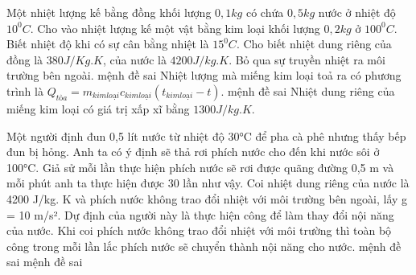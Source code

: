 \begin{ex}
Một nhiệt lượng kế bằng đồng khối lượng $0,1 kg$ có chứa $0,5 kg$ nước ở nhiệt độ $10^0C$. Cho vào nhiệt lượng kế một vật bằng kim loại khối lượng $0,2 kg$ ở $100^0C$. Biết nhiệt độ khi có sự cân bằng nhiệt là $15^0C$. Cho biết nhiệt dung riêng của đồng là $380 J/Kg.K$, của nước là $4200 J/kg.K$. Bỏ qua sự truyền nhiệt ra môi trường bên ngoài.
\choiceTF
{mệnh đề sai}
{\True Nhiệt lượng mà miếng kim loại toả ra có phương trình là $Q_{tỏa} = m_{kim loại}c_{kim loại}(t_{kim loại} - t)$.}
{mệnh đề sai}
{\True Nhiệt dung riêng của miếng kim loại có giá trị xấp xĩ bằng $1300 J/kg.K$.}
\end{ex}

\begin{ex}
Một người định đun 0,5 lít nước từ nhiệt độ 30°C để pha cà phê nhưng thấy bếp đun bị hỏng. Anh ta có ý định sẽ thả rơi phích nước cho đến khi nước sôi ở 100°C. Giả sử mỗi lần thực hiện phích nước sẽ rơi được quãng đường 0,5 m và mỗi phút anh ta thực hiện được 30 lần như vậy. Coi nhiệt dung riêng của nước là 4200 J/kg. K và phích nước không trao đổi nhiệt với môi trường bên ngoài, lấy g = 10 m/s².
\choiceTF
{\True Dự định của người này là thực hiện công để làm thay đổi nội năng của nước.}
{\True Khi coi phích nước không trao đổi nhiệt với môi trường thì toàn bộ công trong mỗi lần lắc phích nước sẽ chuyển thành nội năng cho nước.}
{mệnh đề sai}
{mệnh đề sai}
\end{ex}


